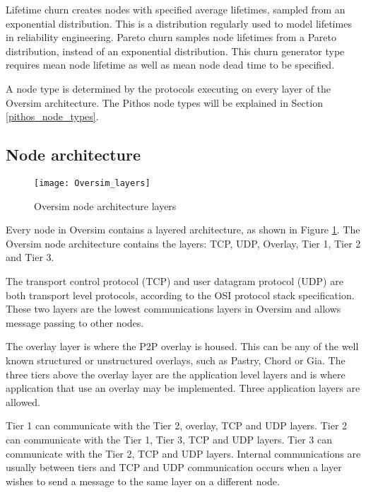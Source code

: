 Lifetime churn creates nodes with specified average lifetimes, sampled from an exponential distribution. This is a distribution regularly used to model lifetimes in reliability engineering. Pareto churn samples node lifetimes from a Pareto distribution, instead of an exponential distribution. This churn generator type requires mean node lifetime as well as mean node dead time to be specified.

A node type is determined by the protocols executing on every layer of the Oversim architecture. The Pithos node types will be explained in Section \ref{pithos_node_types}.

    \subsection{Node architecture}

\begin{figure}[htbp]
 \centering
 \texttt{[image: Oversim\_layers]}
 \caption{Oversim node architecture layers}
 \label{fig_oversim_layers}
\end{figure}


Every node in Oversim contains a layered architecture, as shown in Figure \ref{fig_oversim_layers}. The Oversim node architecture contains the layers: TCP, UDP, Overlay, Tier 1, Tier 2 and Tier 3.

The transport control protocol (TCP) and user datagram protocol (UDP) are both transport level protocols, according to the OSI protocol stack specification. These two layers are the lowest communications layers in Oversim and allows message passing to other nodes.

The overlay layer is where the P2P overlay is housed. This can be any of the well known structured or unstructured overlays, such as Pastry, Chord or Gia. The three tiers above the overlay layer are the application level layers and is where application that use an overlay may be implemented. Three application layers are allowed.

Tier 1 can communicate with the Tier 2, overlay, TCP and UDP layers. Tier 2 can communicate with the Tier 1, Tier 3, TCP and UDP layers. Tier 3 can communicate with the Tier 2, TCP and UDP layers. Internal communications are usually between tiers and TCP and UDP communication occurs when a layer wishes to send a message to the same layer on a different node.

